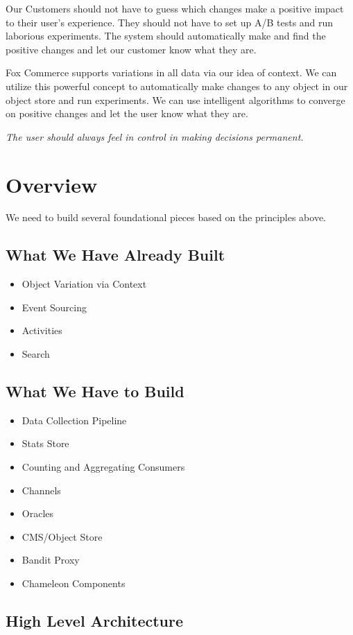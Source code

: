 \documentclass[11pt]{article}
\begin{document}
Our Customers should not have to guess which changes make a positive impact to their
user's experience. They should not have to set up A/B tests and run laborious 
experiments. The system should automatically make and find the positive changes
and let our customer know what they are.

Fox Commerce supports variations in all data via our idea of context. We can
utilize this powerful concept to automatically make changes to any object in our
object store and run experiments. We can use intelligent algorithms to converge on
positive changes and let the user know what they are.

\emph{The user should always feel in control in making decisions permanent.}
\section{Overview}

We need to build several foundational pieces based on the principles above.

\subsection{What We Have Already Built}
\begin{itemize}
    \item Object Variation via Context
    \item Event Sourcing
    \item Activities
    \item Search
\end{itemize}

\subsection{What We Have to Build}
\begin{itemize}
    \item Data Collection Pipeline
    \item Stats Store
    \item Counting and Aggregating Consumers 
    \item Channels
    \item Oracles
    \item CMS/Object Store
    \item Bandit Proxy
    \item Chameleon Components
\end{itemize}

\subsection{High Level Architecture}
\end{document}
